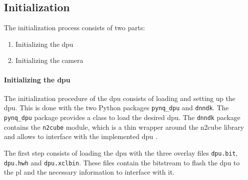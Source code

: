 \subsection{Initialization}
\label{subsec:inference:app:initialization}

The initialization process consists of two parts:
\begin{enumerate}
  \item Initializing the \acrshort{dpu}
  \item Initializing the camera
\end{enumerate}

\paragraph{Initializing the \acrshort{dpu}}
The initialization procedure of the \acrshort{dpu} consists of loading and setting up the \acrshort{dpu}.
This is done with the two Python packages \texttt{pynq\_dpu} and \texttt{dnndk}.
The \texttt{pynq\_dpu} package provides a class to load the desired \acrshort{dpu}.
The \texttt{dnndk} package contains the \texttt{n2cube} module, which is a thin wrapper around the \acrshort{n2cube} library and allows to interface with the implemented \acrshort{dpu} \cite{}. %

The first step consists of loading the \acrshort{dpu} with the three overlay files \texttt{dpu.bit}, \texttt{dpu.hwh} and \texttt{dpu.xclbin}.
These files contain the bitstream to flash the \acrshort{dpu} to the \acrlong{pl} and the necessary information to interface with it.

